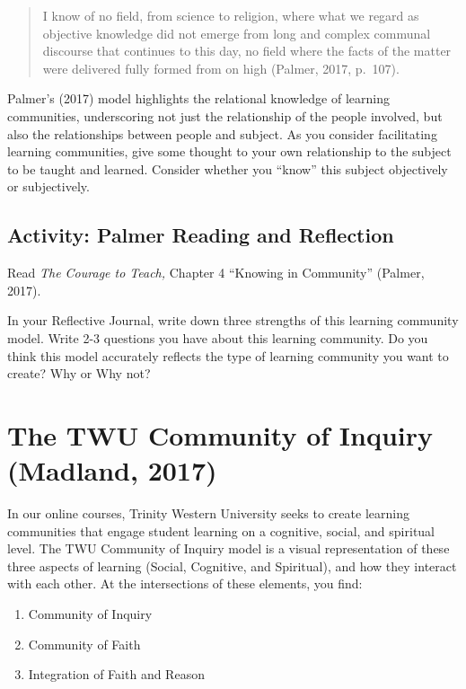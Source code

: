 \documentclass[
]{book}
\providecommand{\tightlist}{%
  \setlength{\itemsep}{0pt}\setlength{\parskip}{0pt}}
\begin{document}
\begin{quote}
I know of no field, from science to religion, where what we regard as objective knowledge did not emerge from long and complex communal discourse that continues to this day, no field where the facts of the matter were delivered fully formed from on high (Palmer, 2017, p.~107).
\end{quote}

Palmer's (2017) model highlights the relational knowledge of learning communities, underscoring not just the relationship of the people involved, but also the relationships between people and subject. As you consider facilitating learning communities, give some thought to your own relationship to the subject to be taught and learned. Consider whether you ``know'' this subject objectively or subjectively.

\hypertarget{activity-palmer-reading-and-reflection}{%
\subsection{Activity: Palmer Reading and Reflection}\label{activity-palmer-reading-and-reflection}}

\begin{reflect}
Read \emph{The Courage to Teach,} Chapter 4 ``Knowing in Community''
(Palmer, 2017).

In your Reflective Journal, write down three strengths of this learning
community model. Write 2-3 questions you have about this learning
community. Do you think this model accurately reflects the type of
learning community you want to create? Why or Why not?
\end{reflect}

\hypertarget{the-twu-community-of-inquiry-madland-2017}{%
\section{The TWU Community of Inquiry (Madland, 2017)}\label{the-twu-community-of-inquiry-madland-2017}}

In our online courses, Trinity Western University seeks to create learning communities that engage student learning on a cognitive, social, and spiritual level. The TWU Community of Inquiry model is a visual representation of these three aspects of learning (Social, Cognitive, and Spiritual), and how they interact with each other. At the intersections of these elements, you find:

\begin{enumerate}
\def\labelenumi{\arabic{enumi}.}
\tightlist
\item
  Community of Inquiry
\item
  Community of Faith
\item
  Integration of Faith and Reason
\end{enumerate}
\end{document}
